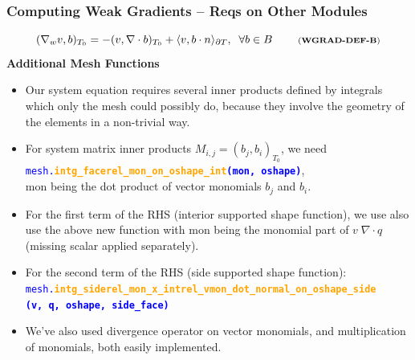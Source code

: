 \documentclass[compress]{beamer}
\begin{document}
\begin{frame}
  \frametitle{Computing Weak Gradients -- Reqs on Other Modules}
  \vspace{-.75cm}
  \begin{equation*}
    (\nabla_w v, b)_{T_0} = -(v, \nabla \cdot b)_{T_0} + \langle v, b \cdot n \rangle_{\partial T}, \;\; \forall b \in B 
    \;\quad\quad \text{\scriptsize (\textbf{WGRAD-DEF-B})}
  \end{equation*}
  \pause
  \textbf{Additional Mesh Functions}
  \begin{itemize}[<+->]
    \item Our system equation requires several inner products defined by integrals which only the mesh could possibly do, because they
      involve the geometry of the elements in a non-trivial way.
    \item For system matrix inner products $M_{i,j} = (b_j, b_i)_{T_0}$, we need\\
      {\small \texttt{\textcolor{blue}{mesh.\textbf{\textcolor{orange}{intg\_facerel\_mon\_on\_oshape\_int}(mon, oshape)}}}},\\
      mon being the dot product of vector monomials $b_j$ and $b_i$.
    \item For the first term of the RHS (interior supported shape function), we use also use the above new function with mon being
      the monomial part of $v \;\nabla \cdot q$ (missing scalar applied separately).
    \item For the second term of the RHS (side supported shape function):
      {\small \texttt{\textcolor{blue}{mesh.\textbf{\textcolor{orange}{intg\_siderel\_mon\_x\_intrel\_vmon\_dot\_normal\_on\_oshape\_side}\\
      \hspace{0.5cm}(v, q, oshape, side\_face)}}}}
    \item We've also used divergence operator on vector monomials, and multiplication of monomials, both easily implemented.
  \end{itemize}
\end{frame}
\end{document}

